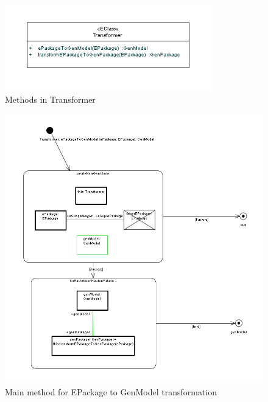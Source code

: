 \begin{figure}[htbp]
\begin{center}  
\includegraphics[width=0.8\textwidth]{pics/Ecore2GenModel_Bilder/EA_ecore2gM.png}
\caption{Methods in \textsf{Transformer}}  
\label{fig_e2gm}
\end{center}
\end{figure} 

\begin{figure}[htbp]
\begin{center}  \includegraphics[width=1.0\textwidth]{pics/Ecore2GenModel_Bilder/EA_ePack2gM.png}
        \caption{Main method for \textsf{EPackage} to \textsf{GenModel} transformation}  
  \label{fig_pack2gm}
\end{center}
\end{figure} 


